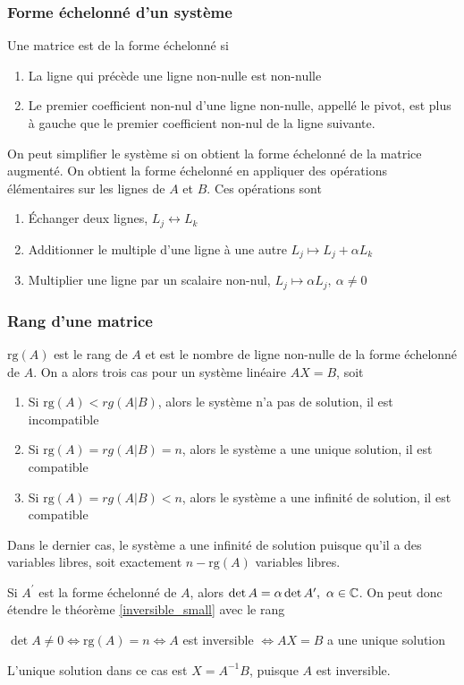 \subsubsection{Forme échelonné d'un système}
Une matrice est de la forme échelonné si \begin{enumerate}
    \item La ligne qui précède une ligne non-nulle est non-nulle
    \item Le premier coefficient non-nul d'une ligne non-nulle, appellé le pivot, est plus à
          gauche que le premier coefficient non-nul de la ligne suivante.
\end{enumerate}
On peut simplifier le système si on obtient la forme échelonné de la matrice augmenté. On obtient la forme échelonné
en appliquer des opérations élémentaires sur les lignes de $A$ et $B$. Ces opérations sont \begin{enumerate}
    \item Échanger deux lignes, $L_j \leftrightarrow L_k$
    \item Additionner le multiple d'une ligne à une autre $L_j \mapsto L_j + \alpha L_k$
    \item Multiplier une ligne par un scalaire non-nul, $L_j \mapsto \alpha L_j, \ \alpha \neq 0$
\end{enumerate}

\subsubsection{Rang d'une matrice}
$\text{rg}(A)$ est le rang de $A$ et est le nombre de ligne non-nulle de la forme échelonné
de $A$. On a alors trois cas pour un système linéaire $AX = B$, soit \begin{enumerate}
    \item Si $\text{rg}(A) < rg(A|B)$, alors le système n'a pas de solution, il est incompatible
    \item Si $\text{rg}(A) = rg(A|B) = n$, alors le système a une unique solution, il est compatible
    \item Si $\text{rg}(A) = rg(A|B) < n$, alors le système a une infinité de solution, il est compatible
\end{enumerate}
Dans le dernier cas, le système a une infinité de solution puisque qu'il a des variables libres,
soit exactement $n - \text{rg}(A)$ variables libres.
\begin{remark}
    Si $A^\prime$ est la forme échelonné de $A$, alors $\det A = \alpha \det A^\prime, \ \alpha \in \mathbb{C}$.
    On peut donc étendre le théorème \ref{inversible_small} avec le rang
\end{remark}
\begin{theorem}
    $\det A \neq 0 \iff \text{rg}(A) = n \iff A $ est inversible $\iff AX=B $ a une unique solution
\end{theorem}
\begin{remark}
    L'unique solution dans ce cas est $X = A^{-1}B$, puisque $A$ est inversible.
\end{remark}

